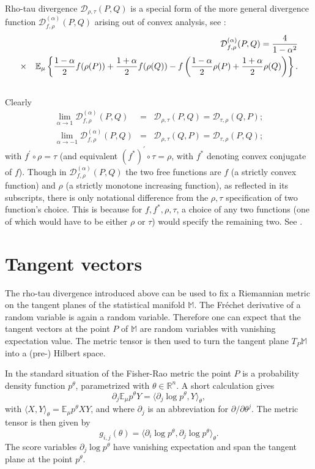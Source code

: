 \documentclass[graybox]{svmult}
\newcommand{\be}{\begin{equation}}
\newcommand{\ee}{\end{equation}}
\newcommand{\beq}{\begin{eqnarray}}
\newcommand{\eeq}{\end{eqnarray}}
\newcommand{\Mo}{\mathbb M}
\newcommand{\Eo}{\mathbb E}
\newcommand{\Ro}{\mathbb R}
\newcommand{\Ddiv}{\mathcal{D}}
\begin{document}
Rho-tau divergence $\Ddiv _{\rho,\tau}(P,Q)$ is a special form of the more general divergence function
$\Ddiv^{(\alpha)}_{f, \rho}(P,Q)$ arising out of convex analysis, see \cite{zhang2004a, zhang2005}:
\beq
\label{alpha_div}
& &\Ddiv^{(\alpha)}_{f, \rho}(P,Q) 
= \frac{4}{1-\alpha^{2}} \cr
&\times&
\Eo_\mu \left\{
 \frac{1-\alpha}{2} f(\rho(P)) + \frac{1+\alpha}{2}
f(\rho(Q)) -  f \left( \frac{1-\alpha}{2}
\rho(P)+\frac{1+\alpha}{2} \rho(Q) \right) \right\} .\cr
& &
\eeq
Clearly
\begin{eqnarray*}
 \lim_{\alpha \rightarrow 1}  \Ddiv^{(\alpha)}_{f, \rho}(P,Q) &=& 
 \Ddiv_{\rho,\tau}(P,Q) = \Ddiv_{\tau,\rho}(Q,P); \\
 \lim_{\alpha \rightarrow -1}  \Ddiv^{(\alpha)}_{f, \rho}(P,Q) &=& 
 \Ddiv_{\rho,\tau}(Q,P) = \Ddiv_{\tau,\rho}(P,Q); 
\end{eqnarray*}
with $f^\prime \circ \rho = \tau$ 
(and equivalent $(f^\ast)^\prime \circ \tau = \rho$, with $f^\ast$ denoting convex conjugate of $f$).  
Though in $\Ddiv^{(\alpha)}_{f, \rho}(P,Q)$ the two free functions are $f$ 
(a strictly convex function) and $\rho$ (a strictly monotone increasing function), as reflected in its subscripts,
there is only notational difference from the $\rho, \tau$ specification of two function's choice. 
This is because for $f, f^\ast, \rho, \tau$, a choice of any two functions 
(one of which would have to be either $\rho$ or $\tau$) would specify the remaining two. See \cite{zhang2004a,zhang15}. 


\section{Tangent vectors}
\label{sect:tangent}

The rho-tau divergence introduced above can be used to fix a Riemannian metric on the tangent planes
of the statistical manifold $\Mo$.
%
The Fr\'echet derivative of a random variable is again a random variable.
Therefore one can expect that
the tangent vectors at the point $P$ of $\Mo$ are random variables with vanishing expectation value.
The metric tensor is then used to turn the tangent plane $T_P\Mo$ into a (pre-) Hilbert space.

In the standard situation of the Fisher-Rao metric the point $P$ is a probability density function $p^\theta$,
parametrized with $\theta\in\Ro^n$. A short calculation gives
\be
\partial_j\Eo_\mu p^\theta Y=\big\langle\partial_j \log p^\theta,Y\big\rangle_\theta,
\label{tangent:fr}
\ee
with $\langle X,Y\rangle_\theta=\Eo_\mu p^\theta XY$,
and where  $\partial_j$ is an abbreviation for $\partial/\partial\theta^j$.
The metric tensor is then given by 
\be
g_{i,j}(\theta)
=
\langle \partial_i \log p^\theta,\partial_j \log p^\theta\rangle_\theta.
\nonumber
\ee
The score variables $\partial_j \log p^\theta$ have vanishing expectation and span the tangent plane
at the point $p^\theta$.
\end{document}
